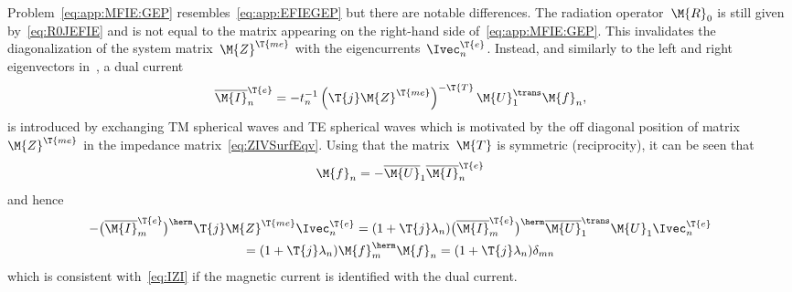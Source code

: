 \documentclass[journal]{IEEEtran}
\providecommand{\Umat}{\M{U}} %
\providecommand{\Ie}{\Ivec^{\T{e}}} %
\begin{document}
Problem~\eqref{eq:app:MFIE:GEP} resembles~\eqref{eq:app:EFIEGEP} but there are notable differences. The radiation operator~$\M{R}_0$ is still given by~\eqref{eq:R0JEFIE} and is not equal to the matrix appearing on the right-hand side of~\eqref{eq:app:MFIE:GEP}. This invalidates the diagonalization of the system matrix~$\M{Z}^\T{me}$ with the eigencurrents~$\Ie_n$. Instead, and similarly to the left and right eigenvectors in~\cite{YlaOijala_GeneralizedTCM2019}, a dual current
\begin{equation}
    \overline{\M{I}}^{\T{e}}_n = - t_n^{-1} \left( \T{j}\M{Z}^\T{me} \right)^{-\T{T}} \Umat_1^\trans \M{f}_n,
\end{equation}
is introduced by exchanging TM spherical waves and TE spherical waves which is motivated by the off diagonal position of matrix~$\M{Z}^\T{me}$ in the impedance matrix~\eqref{eq:ZIVSurfEqv}. Using that the matrix~$\M{T}$ is symmetric (reciprocity), it can be seen that
\begin{equation}
    \M{f}_n = - \overline{\Umat}_1 \overline{\M{I}}^{\T{e}}_n
\end{equation}
and hence
\begin{multline}
    - \big(\overline{\M{I}}^{\T{e}}_m\big)^\herm  \T{j}\M{Z}^\T{me} \Ie_n = (1 + \T{j}\lambda_n ) \big(\overline{\M{I}}^{\T{e}}_m\big)^\herm \overline{\Umat}_1^\trans \Umat_1 \Ie_n \\
    = (1 + \T{j}\lambda_n)\M{f}_m^{\herm}\M{f}_n 
    = (1 + \T{j}\lambda_n)\delta_{mn} 
\end{multline}
which is consistent with~\eqref{eq:IZI} if the magnetic current is identified with the dual current. 
\end{document}
